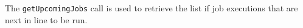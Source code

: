 The \verb+getUpcomingJobs+ call is used to retrieve the list if job executions that are next in line to be run.
